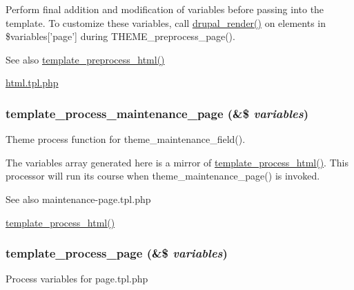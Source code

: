 Perform final addition and modification of variables before passing into the template. To customize these variables, call \hyperlink{common_8inc_a05798b44e8d6c496d4bee5cc32fa7851}{drupal\_\-render()} on elements in \$variables\mbox{[}'page'\mbox{]} during THEME\_\-preprocess\_\-page().

\begin{DoxySeeAlso}{See also}
\hyperlink{includes_2theme_8inc_a5bc9f37111330a160833274482ad866a}{template\_\-preprocess\_\-html()} 

\hyperlink{html_8tpl_8php}{html.tpl.php} 
\end{DoxySeeAlso}
\hypertarget{includes_2theme_8inc_a00d988137020fd53ecaab7dfd4d9b1a5}{
\subsubsection[{template\_\-process\_\-maintenance\_\-page}]{\setlength{\rightskip}{0pt plus 5cm}template\_\-process\_\-maintenance\_\-page (\&\$ {\em variables})}}
\label{includes_2theme_8inc_a00d988137020fd53ecaab7dfd4d9b1a5}
Theme process function for theme\_\-maintenance\_\-field().

The variables array generated here is a mirror of \hyperlink{includes_2theme_8inc_abccf98b29e23c1a9249068558d687da7}{template\_\-process\_\-html()}. This processor will run its course when theme\_\-maintenance\_\-page() is invoked.

\begin{DoxySeeAlso}{See also}
maintenance-\/page.tpl.php 

\hyperlink{includes_2theme_8inc_abccf98b29e23c1a9249068558d687da7}{template\_\-process\_\-html()} 
\end{DoxySeeAlso}
\hypertarget{includes_2theme_8inc_aa9c8d115ebdc2baeae402b3d7e6b392b}{
\subsubsection[{template\_\-process\_\-page}]{\setlength{\rightskip}{0pt plus 5cm}template\_\-process\_\-page (\&\$ {\em variables})}}
\label{includes_2theme_8inc_aa9c8d115ebdc2baeae402b3d7e6b392b}
Process variables for page.tpl.php

